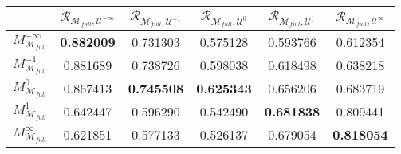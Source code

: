 \begin{tabular}{|l|c|c|c|c|c|}
\toprule
\hline
 & $\mathcal{R}_{\mathcal{M}_{full}, \mathcal{U}^{-\infty}}$ & $\mathcal{R}_{\mathcal{M}_{full}, \mathcal{U}^{-1}}$ & $\mathcal{R}_{\mathcal{M}_{full}, \mathcal{U}^{0}}$ & $\mathcal{R}_{\mathcal{M}_{full}, \mathcal{U}^{1}}$ & $\mathcal{R}_{\mathcal{M}_{full}, \mathcal{U}^{\infty}}$ \\
\hline
\midrule
$M^{-\infty}_{\mathcal{M}_{full}}$ & \textbf{0.882009} & 0.731303 & 0.575128 & 0.593766 & 0.612354 \\
$M^{-1}_{\mathcal{M}_{full}}$ & 0.881689 & 0.738726 & 0.598038 & 0.618498 & 0.638218 \\
$M^{0}_{\mathcal{M}_{full}}$ & 0.867413 & \textbf{0.745508} & \textbf{0.625343} & 0.656206 & 0.683719 \\
$M^{1}_{\mathcal{M}_{full}}$ & 0.642447 & 0.596290 & 0.542490 & \textbf{0.681838} & 0.809441 \\
$M^{\infty}_{\mathcal{M}_{full}}$ & 0.621851 & 0.577133 & 0.526137 & 0.679054 & \textbf{0.818054} \\
\hline
\bottomrule
\end{tabular}
